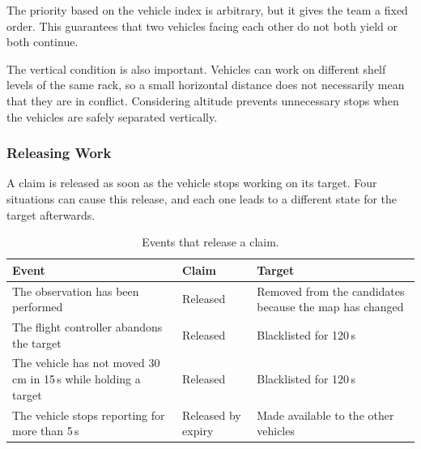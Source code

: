 The priority based on the vehicle index is arbitrary, but it gives the team a
fixed order. This guarantees that two vehicles facing each other do not both yield
or both continue.

The vertical condition is also important. Vehicles can work on different shelf
levels of the same rack, so a small horizontal distance does not necessarily mean
that they are in conflict. Considering altitude prevents unnecessary stops when
the vehicles are safely separated vertically.

\subsubsection*{Releasing Work}

A claim is released as soon as the vehicle stops working on its target. Four
situations can cause this release, and each one leads to a different state for
the target afterwards.

\begin{table}[!htb]
    \centering
    \caption{Events that release a claim.}%
    \label{tab:sys:release}
    \setlength{\tabcolsep}{4pt}
    \begin{tabular}{@{}>{\raggedright\arraybackslash}p{5.6cm}
            >{\raggedright\arraybackslash}p{2.6cm}
            >{\raggedright\arraybackslash}p{6.2cm}@{}}
        \toprule
        \textbf{Event}                                                       & \textbf{Claim}      & \textbf{Target}                                            \\
        \midrule
        The observation has been performed                                   & Released            & Removed from the candidates because the map has changed    \\
        \addlinespace
        The flight controller abandons the target                            & Released            & Blacklisted for 120\,s                                     \\
        \addlinespace
        The vehicle has not moved 30\,cm in 15\,s while holding a target     & Released            & Blacklisted for 120\,s                                     \\
        \addlinespace
        The vehicle stops reporting for more than 5\,s                       & Released by expiry  & Made available to the other vehicles                       \\
        \bottomrule
    \end{tabular}
\end{table}

